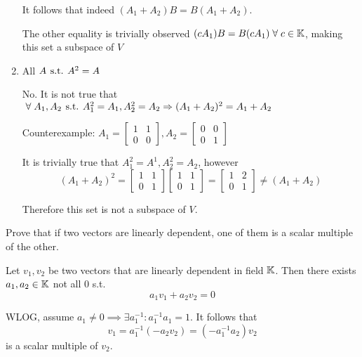 \documentclass[a4paper, 11pt]{article}
\begin{document}
\begin{solution}
\begin{enumerate}
              It follows that indeed \((A_1 + A_2) B = B(A_1 + A_2)\).

              The other equality is trivially observed \((c A_1) B = B (c A_1) \forall c \in \bbk\), making this set a subspace of \(V\)


        \item All \(A \hspace*{4pt}\text{s.t.}\hspace*{4pt} A^2 = A\)

              No. It is not true that \(\forall A_1, A_2 \st A_1^2 = A_1, A_2^2 = A_2 \implies (A_1 + A_2)^2 = A_1 + A_2\)

              Counterexample: \(A_1 = \left[\begin{array}{cc}
                      1 & 1 \\
                      0 & 0
                  \end{array}\right], A_2 = \left[\begin{array}{cc}
                      0 & 0 \\
                      0 & 1
                  \end{array}\right]\)

              It is trivially true that \(A_1^2 = A^1, A_2^2 = A_2\), however \[
                  (A_1 + A_2)^2 = \left[\begin{array}{cc}
                          1 & 1 \\
                          0 & 1
                      \end{array}\right]\left[\begin{array}{cc}
                          1 & 1 \\
                          0 & 1
                      \end{array}\right] = \left[\begin{array}{cc}
                          1 & 2 \\
                          0 & 1
                      \end{array}\right] \neq (A_1 + A_2)
              \]

              Therefore this set is not a subspace of \(V\).
    \end{enumerate}

\end{solution}

\begin{problem} 
Prove that if two vectors are linearly dependent, one of them is a scalar multiple of the other.
\end{problem}
\begin{solution}
    Let \(v_1, v_2\) be two vectors that are linearly dependent in field \(\mathbb{K}\). Then there exists \(a_1, a_2 \in \mathbb{K}\) not all 0 s.t.
    \begin{equation*}
        a_1v_1 + a_2v_2 = 0
    \end{equation*}

    WLOG, assume \(a_1 \neq 0 \implies \exists a_1^{-1}: a_1^{-1}a_1 = 1\). It follows that \[
        v_1 = a_1^{-1}(-a_2v_2) = (-a_1^{-1}a_2)v_2
    \]
    is a scalar multiple of \(v_2\).
\end{solution}
\end{document}
